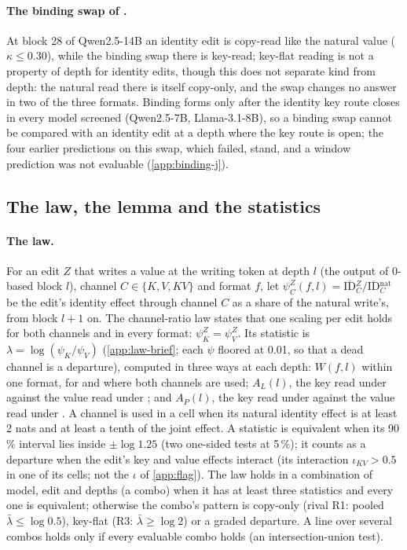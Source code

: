 \paragraph{The binding swap of \citet{prakash2025lookbacks}.}
At block 28 of Qwen2.5-14B an identity edit is copy-read like the natural value ($\kappa \leq 0.30$), while the binding swap there is key-read; key-flat reading is not a property of depth for identity edits, though this does not separate kind from depth: the natural read there is itself copy-only, and the swap changes no answer in two of the three formats. Binding forms only after the identity key route closes in every model screened (Qwen2.5-7B, Llama-3.1-8B), so a binding swap cannot be compared with an identity edit at a depth where the key route is open\rsk; the four earlier predictions on this swap, which failed, stand, and a window prediction\rsk{} was not evaluable (\cref{app:binding-j}).

\subsection{The law, the lemma and the statistics}\label{app:law}

\paragraph{The law.} For an edit $Z$ that writes a value at the writing token at depth $l$ (the output of 0-based block $l$), channel $C \in \{K, V, KV\}$ and format $f$, let $\psi_C^Z(f, l) = \overline{\mathrm{ID}}{}_C^Z / \overline{\mathrm{ID}}{}_C^{\mathrm{nat}}$ be the edit's identity effect through channel $C$ as a share of the natural write's, from block $l{+}1$ on. The channel-ratio law states that one scaling per edit holds for both channels and in every format: $\psi_K^Z = \psi_V^Z$. Its statistic is $\lambda = \log(\psi_K/\psi_V)$ (\cref{app:law-brief}; each $\psi$ floored at 0.01, so that a dead channel is a departure), computed in three ways at each depth: $W(f, l)$ within one format, for \fmtOpt{} and \fmtPost{} where both channels are used; $A_L(l)$, the key read under \fmtLetter{} against the value read under \fmtNone{}; and $A_P(l)$, the key read under \fmtOpt{} against the value read under \fmtNone{}. A channel is used in a cell when its natural identity effect is at least 2 nats and at least a tenth of the joint effect. A statistic is equivalent when its 90\,\% interval lies inside $\pm\log 1.25$ (two one-sided tests at 5\,\%); it counts as a departure when the edit's key and value effects interact (its interaction $\iota_{KV} > 0.5$ in one of its cells; not the $\iota$ of \cref{app:flag}). The law holds in a combination of model, edit and depths (a combo) when it has at least three statistics and every one is equivalent; otherwise the combo's pattern is copy-only (rival R1: pooled $\bar\lambda \leq \log 0.5$), key-flat (R3: $\bar\lambda \geq \log 2$) or a graded departure. A line over several combos holds only if every evaluable combo holds (an intersection-union test).


